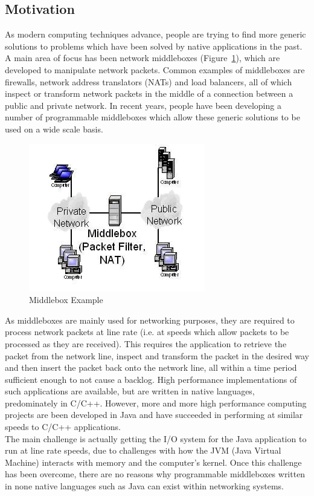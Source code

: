 \documentclass[a4paper, titlepage]{article}
\begin{document}
\subsection{Motivation}
As modern computing techniques advance, people are trying to find more generic solutions to problems which have been solved by native applications in the past. A main area of focus has been network middleboxes (Figure~\ref{fig:middlebox}), which are developed to manipulate network packets. Common examples of middleboxes are firewalls, network address translators (NATs) and load balancers, all of which inspect or transform network packets in the middle of a connection between a public and private network. In recent years, people have been developing a number of programmable middleboxes which allow these generic solutions to be used on a wide scale basis.

\begin{figure}[H]
	\centering
	\includegraphics[scale=0.75]{images/middleboxes.jpg}
	\caption{Middlebox Example}
	\label{fig:middlebox}
\end{figure}

\noindent As middleboxes are mainly used for networking purposes, they are required to process network packets at line rate (i.e. at speeds which allow packets to be processed as they are received). This requires the application to retrieve the packet from the network line, inspect and transform the packet in the desired way and then insert the packet back onto the network line, all within a time period sufficient enough to not cause a backlog. High performance implementations of such applications are available, but are written in native languages, predominately in C/C++. However, more and more high performance computing projects are been developed in Java and have succeeded in performing at similar speeds to C/C++ applications. \\
\newline
The main challenge is actually getting the I/O system for the Java application to run at line rate speeds, due to challenges with how the JVM (Java Virtual Machine) interacts with memory and the computer's kernel. Once this challenge has been overcome, there are no reasons why programmable middleboxes written in none native languages such as Java can exist within networking systems.
\end{document}
